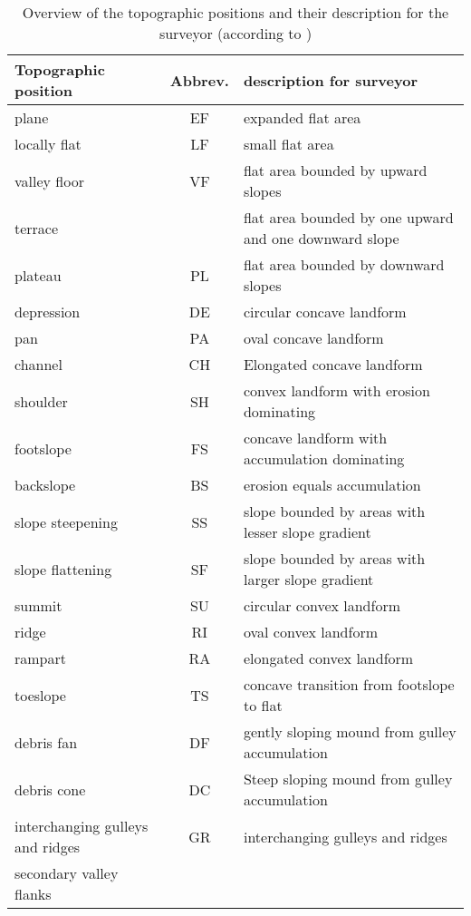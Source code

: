 \documentclass[final,1p,times,twocolumn,authoryear]{elsarticle}
\begin{document}
\begin{table}[!htbp]
\caption{Overview of the topographic positions and their description for the surveyor (according to \cite{Englisch1998})}
\begin{center}    \begin{tabular}{  p{4cm} c p{9cm} }
	\hline\hline
	Topographic position & Abbrev. & description for surveyor \\ \hline
	plane &EF& expanded flat area  \\ 
	locally flat &LF&	small flat area  \\
	valley floor &VF& flat area bounded by upward slopes  \\
	\raisebox{-0ex} {terrace} &\raisebox{-0ex}{TE} & flat area bounded by one upward and one downward slope  \\ 
	plateau &PL& flat area bounded by downward slopes  \\ 
	depression &DE& circular concave landform  \\ 
	pan &PA& oval concave landform  \\ 
	channel &CH& Elongated concave landform  \\ 
	shoulder &SH& convex landform with erosion dominating  \\ 
	footslope &FS& concave landform with accumulation dominating  \\ 
	backslope &BS& erosion equals accumulation  \\ 
	slope steepening &SS& slope bounded by areas with lesser slope gradient  \\ 
	slope flattening &SF& slope bounded by areas with larger slope gradient  \\ 
 	summit &SU& circular convex landform  \\ 
	ridge &RI& oval convex landform  \\ 
	rampart &RA& elongated convex landform  \\ 
	toeslope &TS& concave transition from footslope to flat  \\ 
	debris fan &DF& gently sloping mound from gulley accumulation  \\ 
	debris cone &DC& Steep sloping mound from gulley accumulation  \\ 
	interchanging gulleys and ridges &\raisebox{-1.5ex} {GR} & \raisebox {-1.5ex} {interchanging gulleys and ridges}  \\
	secondary valley flanks &\raisebox{-1.5ex}{SV}& \raisebox{-1.5ex}{secondary valley flanks}  \\ 
    \end{tabular}
\end{center}	
\label{table:topopositions}
\end{table}
\end{document}
